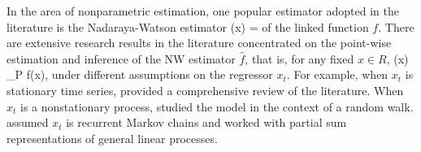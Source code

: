 In the area of nonparametric estimation, one popular estimator adopted in the literature is the Nadaraya-Watson estimator
\bestar
  (x) = 
\eestar
of the linked function $f$. There are extensive research results in the literature concentrated on the point-wise estimation and inference of the NW estimator $\widehat{f}$, that is, for any fixed $x \in R$,
\bestar
{}(x) \to_P f(x),
\eestar
under different assumptions on the regressor $x_t$. For example, when $x_t$ is stationary time series, \cite{hardlelutkepohlchen1997} provided a comprehensive review of the literature. When $x_t$ is a nonstationary process, \cite{phillipspark1998} studied the model in the context of a random walk. \cite{karlsentjostheim2001} assumed $x_t$ is recurrent Markov chains and \citet[][\citeyear{wangphillips2009}, \citeyear{wangphillips2010b}]{wangphillips2010a} worked with partial sum representations of general linear processes. 

